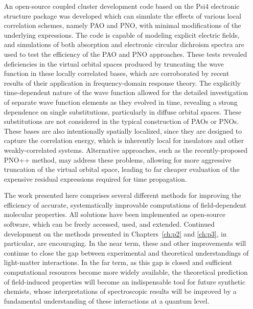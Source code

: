 An open-source coupled cluster development code based on the Psi4 electronic
structure package was developed which can simulate the effects of various
local correlation schemes, namely PAO and PNO, with minimal modifications
of the underlying expressions. The code is capable of modeling explicit
electric fields, and simulations of both absorption and electronic
circular dichroism spectra are used to test the efficiency of the PAO and
PNO approaches. These tests revealed deficiencies in the virtual orbital
spaces produced by truncating the wave function in these locally correlated
bases, which are corroborated by recent results of their application in
frequency-domain response theory. The explicitly time-dependent nature of
the wave function allowed for the detailed investigation of separate wave
function elements as they evolved in time, revealing a strong dependence
on single substitutions, particularly in diffuse orbital spaces. These
substitutions are not considered in the typical construction of PAOs
or PNOs. These bases are also intentionally spatially localized, since
they are designed to capture the correlation energy, which is inherently
local for insulators and other weakly-correlated systems. Alternative 
approaches, such as the recently-proposed PNO++ method,
may address these problems, allowing for more aggressive truncation of the
virtual orbital space, leading to far cheaper evaluation of the expensive
residual expressions required for time propagation.

The work presented here comprises several different methods for improving
the efficiency of accurate, systematically improvable computations of 
field-dependent molecular properties. All solutions have been implemented
as open-source software, which can be freely accessed, used, and extended.
Continued development on the methods presented in Chapters~\ref{ch:p2} 
and \ref{ch:p3}, in particular, are encouraging. 
In the near term, these and other improvements will continue to close the
gap between experimental and theoretical understandings of light-matter
interactions. In the far term, as this gap is closed and sufficient computational
resources become more widely available, the theoretical prediction of 
field-induced properties will become an indispensable tool for future 
synthetic chemists, whose interpretations of spectroscopic results will be 
improved by a fundamental understanding of these interactions at a quantum level.
